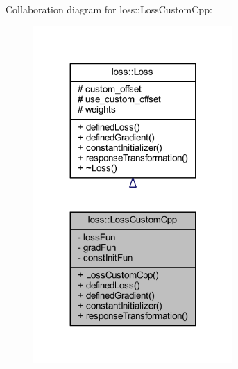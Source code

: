 Collaboration diagram for loss\+:\+:Loss\+Custom\+Cpp\+:
\nopagebreak
\begin{figure}[H]
\begin{center}
\leavevmode
\includegraphics[width=215pt]{classloss_1_1_loss_custom_cpp__coll__graph}
\end{center}
\end{figure}
